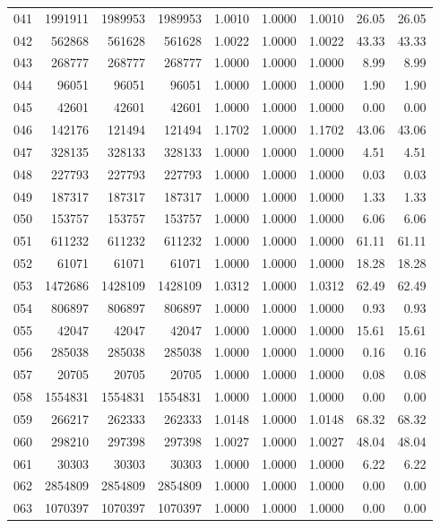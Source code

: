 \begin{longtable}{crrrrrrrr}
041 & 1991911 & 1989953 & 1989953 & 1.0010 & 1.0000 & 1.0010 & 26.05 & 26.05 \\
042 & 562868 & 561628 & 561628 & 1.0022 & 1.0000 & 1.0022 & 43.33 & 43.33 \\
043 & 268777 & 268777 & 268777 & 1.0000 & 1.0000 & 1.0000 & 8.99 & 8.99 \\
044 & 96051 & 96051 & 96051 & 1.0000 & 1.0000 & 1.0000 & 1.90 & 1.90 \\
045 & 42601 & 42601 & 42601 & 1.0000 & 1.0000 & 1.0000 & 0.00 & 0.00 \\
046 & 142176 & 121494 & 121494 & 1.1702 & 1.0000 & 1.1702 & 43.06 & 43.06 \\
047 & 328135 & 328133 & 328133 & 1.0000 & 1.0000 & 1.0000 & 4.51 & 4.51 \\
048 & 227793 & 227793 & 227793 & 1.0000 & 1.0000 & 1.0000 & 0.03 & 0.03 \\
049 & 187317 & 187317 & 187317 & 1.0000 & 1.0000 & 1.0000 & 1.33 & 1.33 \\
050 & 153757 & 153757 & 153757 & 1.0000 & 1.0000 & 1.0000 & 6.06 & 6.06 \\
051 & 611232 & 611232 & 611232 & 1.0000 & 1.0000 & 1.0000 & 61.11 & 61.11 \\
052 & 61071 & 61071 & 61071 & 1.0000 & 1.0000 & 1.0000 & 18.28 & 18.28 \\
053 & 1472686 & 1428109 & 1428109 & 1.0312 & 1.0000 & 1.0312 & 62.49 & 62.49 \\
054 & 806897 & 806897 & 806897 & 1.0000 & 1.0000 & 1.0000 & 0.93 & 0.93 \\
055 & 42047 & 42047 & 42047 & 1.0000 & 1.0000 & 1.0000 & 15.61 & 15.61 \\
056 & 285038 & 285038 & 285038 & 1.0000 & 1.0000 & 1.0000 & 0.16 & 0.16 \\
057 & 20705 & 20705 & 20705 & 1.0000 & 1.0000 & 1.0000 & 0.08 & 0.08 \\
058 & 1554831 & 1554831 & 1554831 & 1.0000 & 1.0000 & 1.0000 & 0.00 & 0.00 \\
059 & 266217 & 262333 & 262333 & 1.0148 & 1.0000 & 1.0148 & 68.32 & 68.32 \\
060 & 298210 & 297398 & 297398 & 1.0027 & 1.0000 & 1.0027 & 48.04 & 48.04 \\
061 & 30303 & 30303 & 30303 & 1.0000 & 1.0000 & 1.0000 & 6.22 & 6.22 \\
062 & 2854809 & 2854809 & 2854809 & 1.0000 & 1.0000 & 1.0000 & 0.00 & 0.00 \\
063 & 1070397 & 1070397 & 1070397 & 1.0000 & 1.0000 & 1.0000 & 0.00 & 0.00 \\

\end{longtable}
